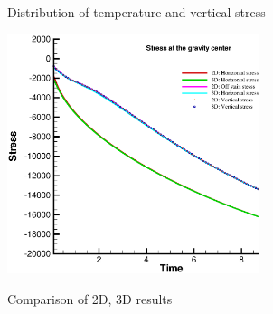 \begin{figure}[!htbp]
\begin{center}
\end{center}
\caption{Distribution of temperature and vertical stress}
\label{fig_TM2_r}
\end{figure}

\begin{figure}[!htbp]
\centering
\includegraphics[height=7cm]{PART_III/TM/figures/2D_3D_cmp}\\
\caption{Comparison of 2D, 3D results }
\label{fig:TMcmp}
\end{figure}

